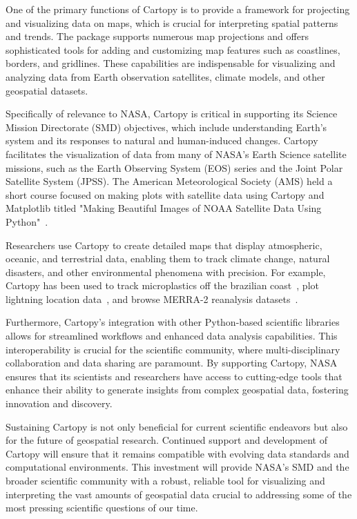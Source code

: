 \documentclass[12pt]{article}
\numberwithin{page}{section}
\begin{document}
One of the primary functions of Cartopy is to provide a framework for projecting and visualizing data on maps,
which is crucial for interpreting spatial patterns and trends.
The package supports numerous map projections and offers sophisticated tools for
adding and customizing map features such as coastlines, borders, and gridlines.
These capabilities are indispensable for visualizing and analyzing data from
Earth observation satellites, climate models, and other geospatial datasets.

Specifically of relevance to NASA, Cartopy is critical in supporting its Science Mission Directorate (SMD) objectives,
which include understanding Earth's system and its responses to natural and human-induced changes.
Cartopy facilitates the visualization of data from many of NASA's Earth Science satellite missions,
such as the Earth Observing System (EOS) series and the Joint Polar Satellite System (JPSS).
The American Meteorological Society (AMS) held a short course focused on making
plots with satellite data using Cartopy and Matplotlib titled
"Making Beautiful Images of NOAA Satellite Data Using Python"~\cite{noaa_short_course}.

Researchers use Cartopy to create detailed maps that display atmospheric, oceanic,
and terrestrial data, enabling them to track climate change, natural disasters,
and other environmental phenomena with precision. For example, Cartopy
has been used to track microplastics off the brazilian coast~\cite{tracking_microplastics},
plot lightning location data~\cite{lightning_location}, and browse MERRA-2
reanalysis datasets~\cite{merra2_plotting}.

Furthermore, Cartopy's integration with other Python-based scientific libraries
allows for streamlined workflows and enhanced data analysis capabilities.
This interoperability is crucial for the scientific community,
where multi-disciplinary collaboration and data sharing are paramount.
By supporting Cartopy, NASA ensures that its scientists and researchers
have access to cutting-edge tools that enhance their ability to generate
insights from complex geospatial data, fostering innovation and discovery.

Sustaining Cartopy is not only beneficial for current scientific endeavors
but also for the future of geospatial research. Continued support and development
of Cartopy will ensure that it remains compatible with evolving data standards
and computational environments. This investment will provide NASA's SMD and the
broader scientific community with a robust, reliable tool for visualizing and
interpreting the vast amounts of geospatial data crucial to addressing some
of the most pressing scientific questions of our time.
\end{document}
